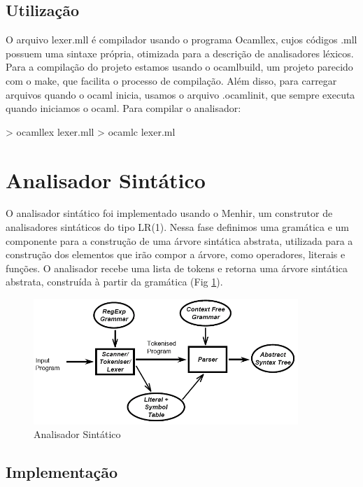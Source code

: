 \documentclass[12pt,a4paper,twoside]{report}
\begin{document}


\subsection{Utilização}

O arquivo lexer.mll é compilador usando o programa Ocamllex, cujos códigos .mll possuem uma sintaxe
própria, otimizada para a descrição de analisadores léxicos. Para a compilação do projeto estamos usando o ocamlbuild, um projeto
parecido com o make, que facilita o processo de compilação. Além disso, para carregar arquivos quando o ocaml inicia, usamos
o arquivo .ocamlinit, que sempre executa quando iniciamos o ocaml. Para compilar o analisador:

\begin{terminal}
> ocamllex lexer.mll
> ocamlc lexer.ml
\end{terminal}

\section{Analisador Sintático}

O analisador sintático foi implementado usando o Menhir, um construtor de analisadores sintáticos do tipo LR(1). Nessa fase definimos
uma gramática e um componente para a construção de uma árvore sintática abstrata, utilizada para a construção dos elementos que irão compor a árvore, como operadores, literais e funções. O analisador recebe uma lista de tokens e retorna uma árvore sintática abstrata, construída à partir da gramática
(Fig \ref{fig:parsing}).

\begin{figure}[h]
	\centering
	\includegraphics[width=10cm]{imagens/parsing}
	\caption{Analisador Sintático}
	\label{fig:parsing}
\end{figure}

\subsection{Implementação}
\end{document}
